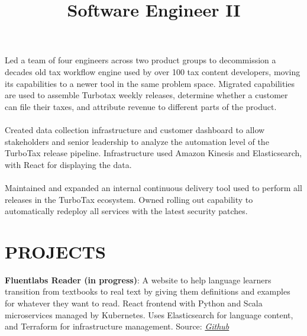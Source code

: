 \documentclass[margin]{res}
\begin{document}
\begin{resume}
\title{\textbf{Software Engineer II}}
\begin{position}
Led a team of four engineers across two product groups to decommission a decades old tax workflow engine used by over 100 tax content developers, moving its capabilities to a newer tool in the same problem space. Migrated capabilities are used to assemble Turbotax weekly releases, determine whether a customer can file their taxes, and attribute revenue to different parts of the product.
\\
\\
Created data collection infrastructure and customer dashboard to allow stakeholders and senior leadership to analyze the automation level of the TurboTax release pipeline. Infrastructure used Amazon Kinesis and Elasticsearch, with React for displaying the data.
\\
\\
Maintained and expanded an internal continuous delivery tool used to perform all releases in the TurboTax ecosystem. Owned rolling out capability to automatically redeploy all services with the latest security patches.
\end{position}


\section{PROJECTS}

\par
\textbf{Fluentlabs Reader (in progress)}:
A website to help language learners transition from textbooks to real text by giving them definitions and examples for whatever they want to read. React frontend with Python and Scala microservices managed by Kubernetes. Uses Elasticsearch for language content, and Terraform for infrastructure management. Source: \textit{\href{https://github.com/fluent-labs/api}{Github}}


\end{resume}
\end{document}
